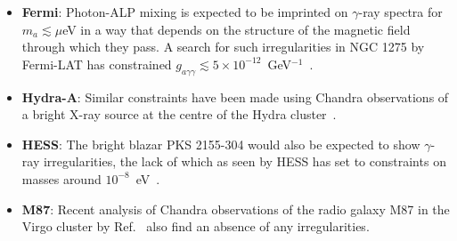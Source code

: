 \begin{itemize}
 \item {\bf Fermi}: Photon-ALP mixing is expected to be imprinted on $\gamma$-ray spectra for $m_a\lesssim\mu$eV in a way that depends on the structure of the magnetic field through which they pass. A search for such irregularities in NGC 1275 by Fermi-LAT has constrained $g_{a\gamma\gamma}\lesssim 5\times10^{-12}$~GeV$^{-1}$~\cite{TheFermi-LAT:2016zue}.
 \item {\bf Hydra-A}: Similar constraints have been made using Chandra observations of a bright X-ray source at the centre of the Hydra cluster~\cite{Wouters:2013hua}.
 \item {\bf HESS}: The bright blazar PKS 2155-304 would also be expected to show $\gamma$-ray irregularities, the lack of which as seen by HESS has set to constraints on masses around $10^{-8}$~eV~\cite{Wouters:2013iya}.
\item {\bf M87}: Recent analysis of Chandra observations of the radio galaxy M87 in the Virgo cluster by Ref.~\cite{Marsh:2017yvc} also find an absence of any irregularities.
\end{itemize}

